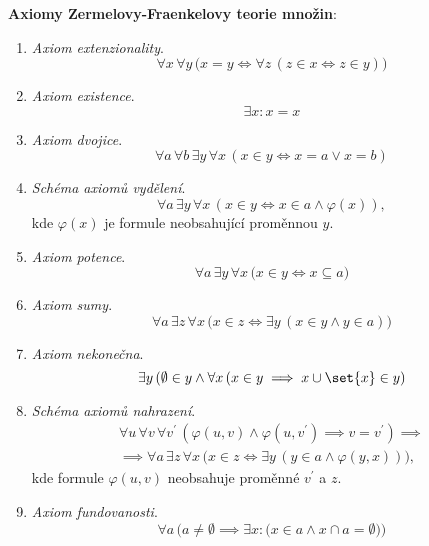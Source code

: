 \noindent\textbf{Axiomy Zermelovy-Fraenkelovy teorie množin}:
\begin{enumerate}[label=({ZF}\arabic*)]
    \item\label{item:axiom_extenzionality} \emph{Axiom extenzionality}.
    \begin{equation*}
        \forall x\,\forall y\,\big(x=y \iff \forall z\,(z\in x \iff z\in y)\big)
    \end{equation*}
    \item\label{item:axiom_existence} \emph{Axiom existence}.
    \begin{equation*}
        \exists x: x=x
    \end{equation*}
    \item\label{item:axiom_dvojice} \emph{Axiom dvojice}.
    \begin{equation*}
        \forall a\,\forall b\,\exists y\,\forall x\,(x \in y \iff x=a \lor x=b)
    \end{equation*}
    \item\label{item:schema_axiomu_vydeleni} \emph{Schéma axiomů vydělení}.
    \begin{equation*}
        \forall a\,\exists y\,\forall x\,(x\in y \iff x\in a \land \varphi(x)),
    \end{equation*}
    kde $\varphi(x)$ je formule neobsahující proměnnou $y$.
    \item\label{item:axiom_potence} \emph{Axiom potence}.
    \begin{equation*}
        \forall a\,\exists y\,\forall x\,\big(x\in y \iff x\subseteq a\big)
    \end{equation*}
    \item\label{item:axiom_sumy} \emph{Axiom sumy}.
    \begin{equation*}
        \forall a\,\exists z\,\forall x\,\big(x\in z\iff \exists y\,(x\in y \land y\in a)\big)
    \end{equation*}
    \item\label{item:axiom_nekonecna} \emph{Axiom nekonečna}.
    \begin{equation*}
        \exists y\, (\emptyset\in y \land \forall x\,(x\in y\implies x\cup\set{x}\in y)
    \end{equation*}
    \item\label{item:schema_axiomu_nahrazeni} \emph{Schéma axiomů nahrazení}.
    \begin{align*}
        \forall u\,\forall v\,\forall v^\prime\,(\varphi(u,v) \land \varphi(u,v^\prime) \implies v=v^\prime)\implies\\ \implies \forall a\,\exists z\,\forall x\,\big(x\in z \iff \exists y\,(y\in a \land \varphi(y,x))\big),
    \end{align*}
    kde formule $\varphi(u,v)$ neobsahuje proměnné $v^\prime$ a $z$.
    \item\label{item:axiom_fundovanosti} \emph{Axiom fundovanosti}.
    \begin{equation*}
        \forall a\,\Big(a\neq\emptyset \implies \exists x:\big(x\in a \land x\cap a=\emptyset\big)\Big)
    \end{equation*}
\end{enumerate}

